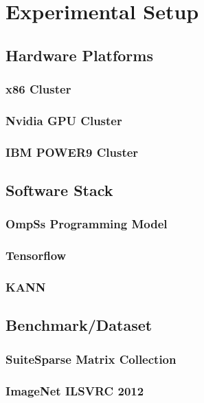 
\chapter{Experimental Setup}
\label{chap:methodology}

\section{Hardware Platforms} 

\subsection{x86 Cluster}
\subsection{Nvidia GPU Cluster}
\subsection{IBM POWER9 Cluster}

\section{Software Stack}

\subsection{OmpSs Programming Model}
\subsection{Tensorflow}
\subsection{KANN}

\section{Benchmark/Dataset}
\subsection{SuiteSparse Matrix Collection}
\subsection{ImageNet ILSVRC 2012}
